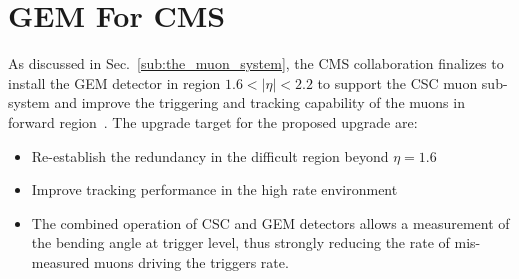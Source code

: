 \section{GEM For CMS} %
\label{sec:gem_for_cms}
As discussed in Sec.~\ref{sub:the_muon_system},  the CMS collaboration finalizes to install the GEM detector in region $1.6 < |\eta| < 2.2$ to support the CSC muon sub-system and improve the triggering and tracking capability of the muons in forward region~\cite{Colaleo:2021453}. 
The upgrade target for the proposed upgrade are:
    \begin{itemize}
        \item Re-establish the redundancy in the difficult region beyond $\eta = 1.6 $
        \item Improve tracking performance in the high rate environment
        \item The combined operation of CSC and GEM detectors allows a measurement of the bending angle at trigger level, thus strongly reducing the rate of mis-measured muons driving the triggers rate.
    \end{itemize}
